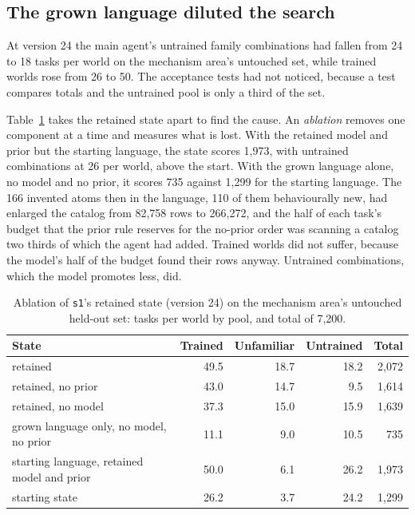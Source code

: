 \documentclass[11pt]{article}
\begin{document}
\subsection{The grown language diluted the search}
\label{sec:dilution}

At version 24 the main agent's untrained family combinations had fallen from 24 to 18 tasks per world on the mechanism area's untouched set, while trained worlds rose from 26 to 50. The acceptance tests had not noticed, because a test compares totals and the untrained pool is only a third of the set.

Table~\ref{tab:ablation} takes the retained state apart to find the cause. An \emph{ablation} removes one component at a time and measures what is lost. With the retained model and prior but the starting language, the state scores 1,973, with untrained combinations at 26 per world, above the start. With the grown language alone, no model and no prior, it scores 735 against 1,299 for the starting language. The 166 invented atoms then in the language, 110 of them behaviourally new, had enlarged the catalog from 82,758 rows to 266,272, and the half of each task's budget that the prior rule reserves for the no-prior order was scanning a catalog two thirds of which the agent had added. Trained worlds did not suffer, because the model's half of the budget found their rows anyway. Untrained combinations, which the model promotes less, did.

\begin{table}[t]
\centering
\caption{Ablation of \texttt{s1}'s retained state (version 24) on the mechanism area's untouched held-out set: tasks per world by pool, and total of 7,200.}
\label{tab:ablation}
\begin{tabular}{lrrrr}
\toprule
State & Trained & Unfamiliar & Untrained & Total \\
\midrule
retained & 49.5 & 18.7 & 18.2 & 2,072 \\
retained, no prior & 43.0 & 14.7 & 9.5 & 1,614 \\
retained, no model & 37.3 & 15.0 & 15.9 & 1,639 \\
grown language only, no model, no prior & 11.1 & 9.0 & 10.5 & 735 \\
starting language, retained model and prior & 50.0 & 6.1 & 26.2 & 1,973 \\
starting state & 26.2 & 3.7 & 24.2 & 1,299 \\
\bottomrule
\end{tabular}
\end{table}
\end{document}
